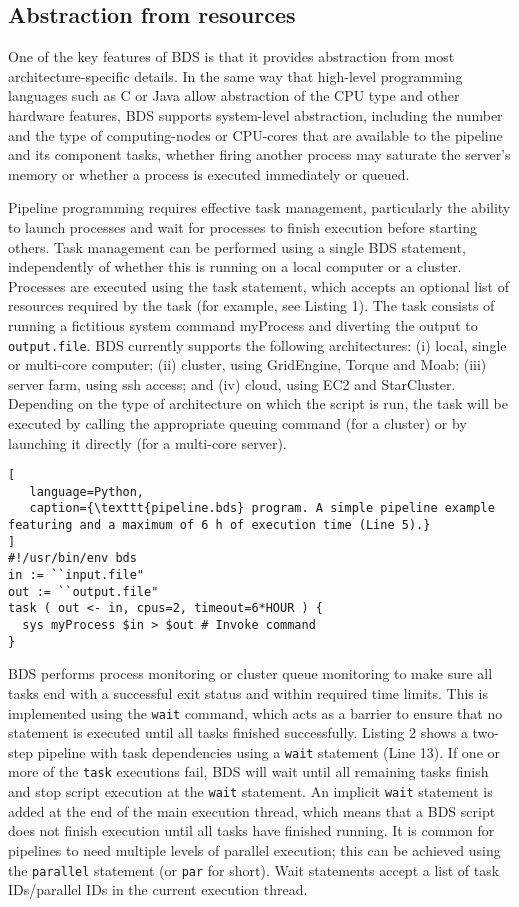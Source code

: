 \subsection{Abstraction from resources}

One of the key features of BDS is that it provides abstraction from most architecture-specific details. In the same way that high-level programming languages such as C or Java allow abstraction of the CPU type and other hardware features, BDS supports system-level abstraction, including the number and the type of computing-nodes or CPU-cores that are available to the pipeline and its component tasks, whether firing another process may saturate the server’s memory or whether a process is executed immediately or queued.

Pipeline programming requires effective task management, particularly the ability to launch processes and wait for processes to finish execution before starting others. Task management can be performed using a single BDS statement, independently of whether this is running on a local computer or a cluster. Processes are executed using the task statement, which accepts an optional list of resources required by the task (for example, see Listing 1). The task consists of running a fictitious system command myProcess and diverting the output to \texttt{output.file}. BDS currently supports the following architectures: (i) local, single or multi-core computer; (ii) cluster, using GridEngine, Torque and Moab; (iii) server farm, using ssh access; and (iv) cloud, using EC2 and StarCluster. Depending on the type of architecture on which the script is run, the task will be executed by calling the appropriate queuing command (for a cluster) or by launching it directly (for a multi-core server).

\begin{lstlisting}[
   language=Python,
   caption={\texttt{pipeline.bds} program. A simple pipeline example featuring and a maximum of 6 h of execution time (Line 5).}
]
#!/usr/bin/env bds
in := ``input.file"
out := ``output.file"
task ( out <- in, cpus=2, timeout=6*HOUR ) {
  sys myProcess $in > $out # Invoke command
}
\end{lstlisting}

BDS performs process monitoring or cluster queue monitoring to make sure all tasks end with a successful exit status and within required time limits. This is implemented using the \texttt{wait} command, which acts as a barrier to ensure that no statement is executed until all tasks finished successfully. Listing 2 shows a two-step pipeline with task dependencies using a \texttt{wait} statement (Line 13). If one or more of the \texttt{task} executions fail, BDS will wait until all remaining tasks finish and stop script execution at the \texttt{wait} statement. An implicit \texttt{wait} statement is added at the end of the main execution thread, which means that a BDS script does not finish execution until all tasks have finished running. It is common for pipelines to need multiple levels of parallel execution; this can be achieved using the \texttt{parallel} statement (or \texttt{par} for short). Wait statements accept a list of task IDs/parallel IDs in the current execution thread.


